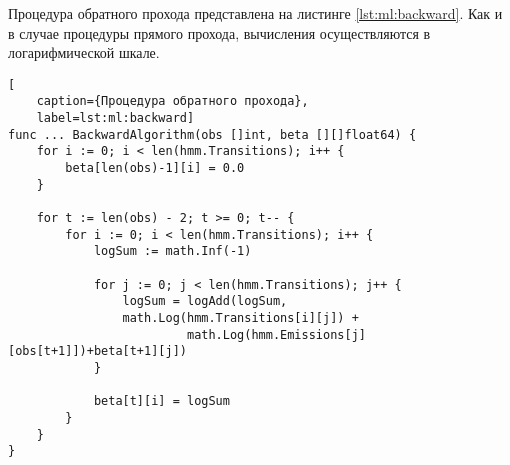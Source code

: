 %	
%		
%	
%
%
%
%
Процедура обратного прохода представлена на листинге \ref{lst:ml:backward}. Как и в случае процедуры прямого прохода, вычисления осуществляются в логарифмической шкале. 
\begin{lstlisting}[
	caption={Процедура обратного прохода},
	label=lst:ml:backward]
func ... BackwardAlgorithm(obs []int, beta [][]float64) {
	for i := 0; i < len(hmm.Transitions); i++ {
		beta[len(obs)-1][i] = 0.0
	}
	
	for t := len(obs) - 2; t >= 0; t-- {
		for i := 0; i < len(hmm.Transitions); i++ {
			logSum := math.Inf(-1)
			
			for j := 0; j < len(hmm.Transitions); j++ {
				logSum = logAdd(logSum,
				math.Log(hmm.Transitions[i][j]) + 
						 math.Log(hmm.Emissions[j][obs[t+1]])+beta[t+1][j])
			}
		
			beta[t][i] = logSum
		}
	}
}
\end{lstlisting}

